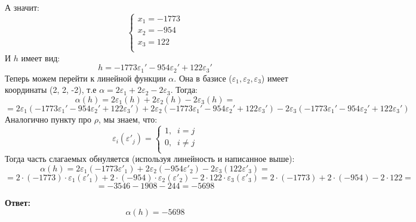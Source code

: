 \documentclass[a4paper,12pt]{article}
\begin{document}
А значит:
\[
\begin{cases}
x_1 = -1773\\
x_2 = -954\\
x_3 = 122\\
\end{cases}
\]
И $h$ имеет вид:
\[
h = -1773\varepsilon_1' -954 \varepsilon_2' + 122\varepsilon_3'
\]
Теперь можем перейти к линейной функции $\alpha$. Она в базисе ($\varepsilon_1, \varepsilon_2, \varepsilon_3$) имеет координаты (2, 2, -2), т.е $\alpha = 2\varepsilon_1 + 2\varepsilon_2 - 2\varepsilon_3$. Тогда:
\[
\alpha(h) = 2\varepsilon_1(h) + 2 \varepsilon_2(h) -2 \varepsilon_3(h) = 
\]
\[
=  2 \varepsilon_1(-1773\varepsilon_1' -954 \varepsilon_2' + 122\varepsilon_3') + 2 \varepsilon_2(-1773\varepsilon_1' -954 \varepsilon_2' + 122\varepsilon_3') -2\varepsilon_3(-1773\varepsilon_1' -954 \varepsilon_2' + 122\varepsilon_3')
\]
Аналогично пункту про $\rho$, мы знаем, что:
\[
\varepsilon_i(\varepsilon'_j) = \begin{cases}
1, \; \; i = j \\
0, \; \; i \neq j\\
\end{cases}
\]
Тогда часть слагаемых обнуляется (используя линейность и написанное выше):
\[
\alpha(h) = 2\varepsilon_1(-1773\varepsilon'_1)  + 2\varepsilon_2(-954 \varepsilon'_2) - 2 \varepsilon_3(122\varepsilon'_3) = 
\]
\[
=
2 \cdot (-1773) \cdot  \varepsilon_1(\varepsilon'_1) +2 \cdot(-954) \cdot \varepsilon_2(\varepsilon'_2) -2 \cdot 122 \cdot \varepsilon_3(\varepsilon'_3) = 2 \cdot(-1773) + 2  \cdot(-954) - 2 \cdot 122 =
\]
\[
=
 -3546 - 1908 -244 = -5698
\]
{\Large \begin{center}
\textbf{Ответ: } 
\[
\alpha(h) = -5698
\]
\end{center}}
\end{document}
